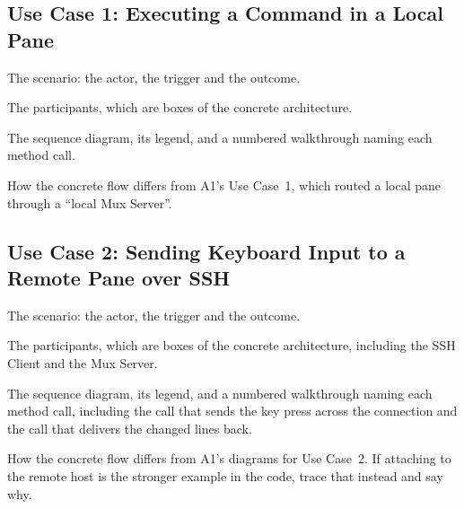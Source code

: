 \subsection{Use Case 1: Executing a Command in a Local Pane}
\label{sec:use-case-1}

\begin{requirements}
  \item The scenario: the actor, the trigger and the outcome.
  \item The participants, which are boxes of the concrete architecture.
  \item The sequence diagram, its legend, and a numbered walkthrough naming each method call.
  \item How the concrete flow differs from A1's Use Case~1, which routed a local pane through a ``local Mux Server''.
\end{requirements}

\subsection{Use Case 2: Sending Keyboard Input to a Remote Pane over SSH}
\label{sec:use-case-2}

\begin{requirements}
  \item The scenario: the actor, the trigger and the outcome.
  \item The participants, which are boxes of the concrete architecture, including the SSH Client and the Mux Server.
  \item The sequence diagram, its legend, and a numbered walkthrough naming each method call, including the call that sends the key press across the connection and the call that delivers the changed lines back.
  \item How the concrete flow differs from A1's diagrams for Use Case~2. If attaching to the remote host is the stronger example in the code, trace that instead and say why.
\end{requirements}
